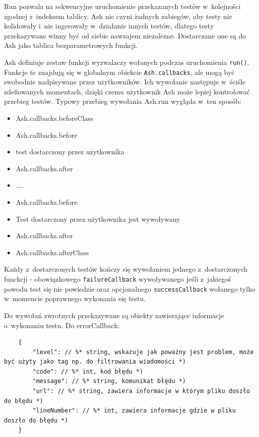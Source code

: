 \documentclass[brudnopis]{xmgr}
\begin{document}
Run pozwala na sekwencyjne uruchomienie przekazanych testów w~kolejności zgodnej z~indeksem tablicy. Ash nie czyni żadnych zabiegów, aby testy nie kolidowały i~nie ingerowały w~działanie innych testów, dlatego testy przekazywane winny być od siebie nawzajem niezależne. Dostarczane one są do Ash jako tablica bezparametrowych funkcji.

Ash definiuje zestaw funkcji wyzwalaczy wołanych podczas uruchomienia \texttt{run()}. Funkcje te znajdują się w globalnym obiekcie \texttt{Ash.callbacks}, ale mogą być swobodnie nadpisywane przez użytkowników. Ich wywołanie następuje w~ściśle zdefiowanych momentach, dzięki czemu użytkownik Ash może lepiej kontrolować przebieg testów. Typowy przebieg wywołania Ash.run wygląda w~ten sposób:

\begin{itemize}
  \item Ash.callbacks.beforeClass
  \item Ash.callbacks.before
  \item {test dostarczony przez użytkownika}
  \item Ash.callbacks.after
  \item ....
  \item Ash.callbacks.before
  \item Test dostarczony przez użytkownika jest wywoływany
  \item Ash.callbacks.after
  \item Ash.callbacks.afterClass
\end{itemize}

Każdy z~dostarczonych testów kończy się wywołaniem jednego z~dostarczonych funckcji - obowiązkowego \texttt{failureCallback} wywoływanego jeśli z~jakiegoś powodu test się nie powiedzie oraz opcjonalnego \texttt{successCallback} wołanego tylko w~momencie poprawnego wykonania się testu.

Do wywołań zwrotnych przekazywane są obiekty zawierające informacje o~wykonaniu testu. Do errorCallback:

\begin{lstlisting}
	{
		"level": // %* string, wskazuje jak poważny jest problem, może być użyty jako tag np. do filtrowania wiadomości *)
		"code": // %* int, kod błędu *)
		"message": // %* string, komunikat błędu *) 
		"url": // %* string, zawiera informacje w którym pliku doszło do błędu *)
		"lineNumber": // %* int, zawiera informacje gdzie w pliku doszło do błędu *)
	}
\end{lstlisting}
\end{document}
